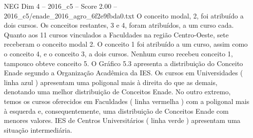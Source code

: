 \begin{textsample}{NEG Dim 4 – 2016\_c5 – Score 2.00 – 2016\_c5/enade\_2016\_agro\_6f2e9fbda0.txt}
O conceito modal, 2, foi atribuído a dois cursos.
Os conceitos restantes, 3 e 4, foram atribuídos, a um curso cada.
Quanto aos 11 cursos vinculados a Faculdades na região Centro-Oeste, sete receberam o conceito modal 2.
O conceito 1 foi atribuído a um curso, assim como o conceito 4, e o conceito 3, a dois cursos.
Nenhum curso recebeu conceito 1, tampouco obteve conceito 5.
O Gráfico 5.3 apresenta a distribuição do Conceito Enade segundo a Organização Acadêmica da IES.
Os cursos em Universidades ( linha azul ) apresentam uma poligonal mais à direita do que as demais, denotando uma melhor distribuição de Conceitos Enade.
No outro extremo, temos os cursos oferecidos em Faculdades ( linha vermelha ) com a poligonal mais à esquerda e, consequentemente, uma distribuição de Conceitos Enade com menores valores.
IES de Centros Universitários ( linha verde ) apresentam uma situação intermediária.

\end{textsample}
